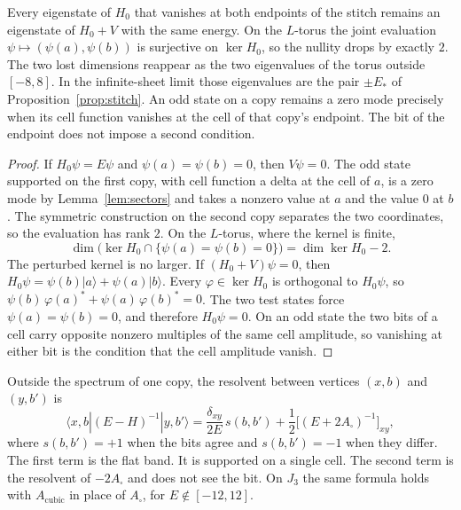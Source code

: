 \begin{proposition}
\label{prop:stubs}
Every eigenstate of \(H_0\) that vanishes at both endpoints of the stitch
remains an eigenstate of \(H_0+V\) with the same energy.
On the \(L\)-torus the joint evaluation \(\psi\mapsto(\psi(a),\psi(b))\) is
surjective on \(\ker H_0\), so the nullity drops by exactly \(2\).
The two lost dimensions reappear as the two eigenvalues of the torus
outside \([-8,8]\).
In the infinite-sheet limit those eigenvalues are the pair \(\pm E_*\) of
Proposition~\ref{prop:stitch}.
An odd state on a copy remains a zero mode precisely when its cell
function vanishes at the cell of that copy's endpoint.
The bit of the endpoint does not impose a second condition.
\end{proposition}

\begin{proof}
If \(H_0\psi=E\psi\) and \(\psi(a)=\psi(b)=0\), then \(V\psi=0\).
The odd state supported on the first copy, with cell function a delta at
the cell of \(a\), is a zero mode by Lemma~\ref{lem:sectors} and takes a
nonzero value at \(a\) and the value \(0\) at \(b\).
The symmetric construction on the second copy separates the two
coordinates, so the evaluation has rank \(2\).
On the \(L\)-torus, where the kernel is finite,
\[
\dim\bigl(\ker H_0\cap\{\psi(a)=\psi(b)=0\}\bigr)=\dim\ker H_0-2.
\]
The perturbed kernel is no larger.
If \((H_0+V)\psi=0\), then \(H_0\psi=\psi(b)|a\rangle+\psi(a)|b\rangle\).
Every \(\varphi\in\ker H_0\) is orthogonal to \(H_0\psi\), so
\(\psi(b)\,\varphi(a)^*+\psi(a)\,\varphi(b)^*=0\).
The two test states force \(\psi(a)=\psi(b)=0\), and therefore \(H_0\psi=0\).
On an odd state the two bits of a cell carry opposite nonzero multiples of
the same cell amplitude, so vanishing at either bit is the condition that
the cell amplitude vanish.
\end{proof}

\begin{proposition}
\label{prop:cellpole}
Outside the spectrum of one copy, the resolvent between vertices
\((x,b)\) and \((y,b')\) is
\begin{equation}
\label{eq:cellpole}
\langle x,b|(E-H)^{-1}|y,b'\rangle
=\frac{\delta_{xy}}{2E}\,s(b,b')
+\frac12\bigl[(E+2A_\square)^{-1}\bigr]_{xy},
\end{equation}
where \(s(b,b')=+1\) when the bits agree and \(s(b,b')=-1\) when they differ.
The first term is the flat band. It is supported on a single cell.
The second term is the resolvent of \(-2A_\square\) and does not see the bit.
On \(J_3\) the same formula holds with \(A_{\mathrm{cubic}}\) in place of
\(A_\square\), for \(E\notin[-12,12]\).
\end{proposition}

